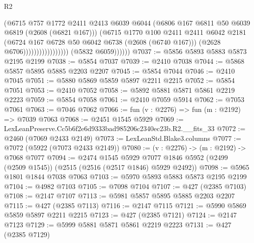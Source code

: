 \begin{lexlean}{R2}
\begin{coremodule}
                                          (@6715
                                            @757
                                            @1772
                                            @2411
                                            @2413
                                            @6039
                                            @6044
                                            (@6806 @167 @6811 @50 @6039 @6819 (@2608 (@6821 @167)))
                                            (@6715
                                              @1770
                                              @100
                                              @2411
                                              @2411
                                              @6042
                                              @2181
                                              (@6724
                                                @167
                                                @6728
                                                @50
                                                @6042
                                                @6738
                                                (@2608 (@6740 @167)))
                                              (@2628 @6706)))))))))))))))))
              (@5832 @6059))))))
@7037 := @5856 @5893 @5883 @5873 @2195 @2199
@7038 := @5854 @7037
@7039 := @2410 @7038
@7044 := @5868 @5857 @5895 @5885 @2203 @2207
@7045 := @5854 @7044
@7046 := @2410 @7045
@7051 := @5880 @5869 @5859 @5897 @2211 @2215
@7052 := @5854 @7051
@7053 := @2410 @7052
@7058 := @5892 @5881 @5871 @5861 @2219 @2223
@7059 := @5854 @7058
@7061 := @2410 @7059 @5914
@7062 := @7053 @7061
@7063 := @7046 @7062
@7066 := fun (v : @2276) => fun (m : @2192) => @7039 @7063
@7068 := @2451 @1545 @5929
@7069 := LexLeanPreserve.Cc5b6f2e6d9333bad985206c2340ec23b.R2.__fits_33
@7072 := @2460 (@7069 @2433 @2149)
@7073 := LexLeanStd.Blake3.columns
@7077 := @7072 (@5922 (@7073 @2433 @2149))
@7080 := (v : @2276) -> (m : @2192) -> @7068 @7077
@7094 := @2474
    @1545
    @5929
    @7077
    @1846
    @5952
    (@2499 (@2509 @1545))
    (@2515 (@2516 (@2517 @1846) @5929 @2492))
@7098 := @5965 @1801 @1844 @7038 @7063
@7103 := @5970 @5893 @5883 @5873 @2195 @2199
@7104 := @4982 @7103
@7105 := @7098 @7104
@7107 := @427 (@2385 @7103)
@7108 := @2147 @7107
@7113 := @5981 @5857 @5895 @5885 @2203 @2207
@7115 := @427 (@2385 @7113)
@7116 := @2147 @7115
@7121 := @5990 @5869 @5859 @5897 @2211 @2215
@7123 := @427 (@2385 @7121)
@7124 := @2147 @7123
@7129 := @5999 @5881 @5871 @5861 @2219 @2223
@7131 := @427 (@2385 @7129)

\end{coremodule}
\end{lexlean}
